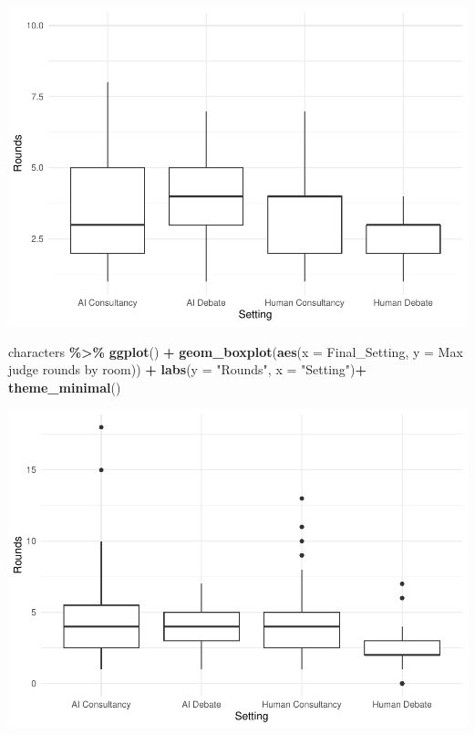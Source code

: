 \documentclass[
]{article}
\newenvironment{Shaded}{\begin{snugshade}}{\end{snugshade}}
\newcommand{\AttributeTok}[1]{\textcolor[rgb]{0.13,0.29,0.53}{#1}}
\newcommand{\FunctionTok}[1]{\textcolor[rgb]{0.13,0.29,0.53}{\textbf{#1}}}
\newcommand{\NormalTok}[1]{#1}
\newcommand{\SpecialCharTok}[1]{\textcolor[rgb]{0.81,0.36,0.00}{\textbf{#1}}}
\newcommand{\StringTok}[1]{\textcolor[rgb]{0.31,0.60,0.02}{#1}}
\begin{document}
\includegraphics[width=1\linewidth]{debate-2309_files/figure-latex/rounds graph-2}

\begin{Shaded}
\begin{Highlighting}[]
\NormalTok{characters }\SpecialCharTok{\%\textgreater{}\%}
  \FunctionTok{ggplot}\NormalTok{() }\SpecialCharTok{+}
  \FunctionTok{geom\_boxplot}\NormalTok{(}\FunctionTok{aes}\NormalTok{(}\AttributeTok{x =}\NormalTok{ Final\_Setting, }\AttributeTok{y =} \StringTok{\textasciigrave{}}\AttributeTok{Max judge rounds by room}\StringTok{\textasciigrave{}}\NormalTok{)) }\SpecialCharTok{+}
  \FunctionTok{labs}\NormalTok{(}\AttributeTok{y =} \StringTok{"Rounds"}\NormalTok{, }\AttributeTok{x =} \StringTok{"Setting"}\NormalTok{)}\SpecialCharTok{+}
  \FunctionTok{theme\_minimal}\NormalTok{()}
\end{Highlighting}
\end{Shaded}

\includegraphics[width=1\linewidth]{debate-2309_files/figure-latex/rounds graph-3}
\end{document}

